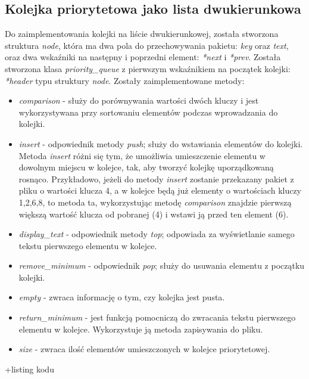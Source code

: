 \documentclass[12pt]{article}
\begin{document}
\subsection{Kolejka priorytetowa jako lista dwukierunkowa}
Do zaimplementowania kolejki na liście dwukierunkowej, została stworzona struktura \textit{node}, 
która ma dwa pola do przechowywania pakietu: \textit{key} oraz \textit{text}, oraz dwa wskaźniki 
na następny i poprzedni element: \textit{*next} i \textit{*prev}. Została stworzona klasa 
\textit{priority\_queue} z pierwszym wskaźnikiem na początek kolejki: \textit{*header} 
typu struktury \textit{node}. Zostały zaimplementowane metody:
\begin{itemize}
    \item \textit{comparison} - służy do porównywania wartości dwóch kluczy i jest 
    wykorzystywana przy sortowaniu elementów podczas wprowadzania do kolejki.
    \item \textit{insert} - odpowiednik metody \textit{push}; służy do wstawiania elementów 
    do kolejki. Metoda \textit{insert} różni się tym, że umożliwia umieszczenie elementu w 
    dowolnym miejscu w kolejce, tak, aby tworzyć kolejkę uporządkowaną rosnąco. Przykładowo, jeżeli
    do metody \textit{insert} zostanie przekazany pakiet z pliku o wartości klucza 4, a w kolejce
    będą już elementy o wartościach kluczy 1,2,6,8, to metoda ta, wykorzystując metodę \textit{comparison}
    znajdzie pierwszą większą wartość klucza od pobranej (4) i wstawi ją przed ten element (6).
    \item \textit{display\_text} - odpowiednik metody \textit{top}; odpowiada za
    wyświetlanie samego tekstu pierwszego elementu w kolejce.
    \item \textit{remove\_minimum} - odpowiednik \textit{pop}; służy do usuwania elementu z 
    początku kolejki. 
    \item \textit{empty} - zwraca informację o tym, czy kolejka jest pusta.
    \item \textit{return\_minimum} - jest funkcją pomocniczą do zwracania tekstu pierwszego 
    elementu w kolejce. Wykorzystuje ją metoda zapisywania do pliku. 
    \item \textit{size} - zwraca ilość elementów umieszczonych w kolejce priorytetowej.
\end{itemize}

\colorbox{Dandelion}{+listing kodu}
\end{document}
